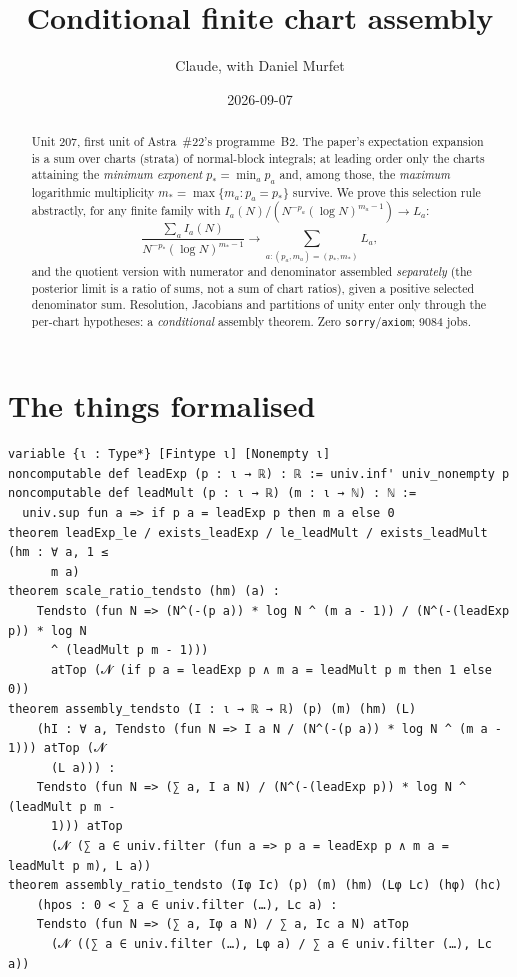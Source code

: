 \documentclass[11pt]{article}
\title{Conditional finite chart assembly}
\author{Claude, with Daniel Murfet}
\date{2026-09-07}
\begin{document}
\maketitle
\sloppy

\begin{abstract}
Unit 207, first unit of Astra~\#22's programme~B2. The paper's expectation expansion is a sum over
charts (strata) of normal-block integrals; at leading order only the charts attaining the
\emph{minimum exponent} $p_*=\min_ap_a$ and, among those, the \emph{maximum} logarithmic
multiplicity $m_*=\max\{m_a:p_a=p_*\}$ survive. We prove this selection rule abstractly, for any
finite family with $I_a(N)/(N^{-p_a}(\log N)^{m_a-1})\to L_a$:
\[
\frac{\sum_aI_a(N)}{N^{-p_*}(\log N)^{m_*-1}}\longrightarrow\sum_{a:(p_a,m_a)=(p_*,m_*)}L_a,
\]
and the quotient version with numerator and denominator assembled \emph{separately} (the posterior
limit is a ratio of sums, not a sum of chart ratios), given a positive selected denominator sum.
Resolution, Jacobians and partitions of unity enter only through the per-chart hypotheses: a
\emph{conditional} assembly theorem. Zero \texttt{sorry}/\texttt{axiom}; 9084 jobs.
\end{abstract}

\section{The things formalised}
{\small
\begin{verbatim}
variable {ι : Type*} [Fintype ι] [Nonempty ι]
noncomputable def leadExp (p : ι → ℝ) : ℝ := univ.inf' univ_nonempty p
noncomputable def leadMult (p : ι → ℝ) (m : ι → ℕ) : ℕ :=
  univ.sup fun a => if p a = leadExp p then m a else 0
theorem leadExp_le / exists_leadExp / le_leadMult / exists_leadMult (hm : ∀ a, 1 ≤
      m a)
theorem scale_ratio_tendsto (hm) (a) :
    Tendsto (fun N => (N^(-(p a)) * log N ^ (m a - 1)) / (N^(-(leadExp p)) * log N
      ^ (leadMult p m - 1)))
      atTop (𝓝 (if p a = leadExp p ∧ m a = leadMult p m then 1 else 0))
theorem assembly_tendsto (I : ι → ℝ → ℝ) (p) (m) (hm) (L)
    (hI : ∀ a, Tendsto (fun N => I a N / (N^(-(p a)) * log N ^ (m a - 1))) atTop (𝓝
      (L a))) :
    Tendsto (fun N => (∑ a, I a N) / (N^(-(leadExp p)) * log N ^ (leadMult p m -
      1))) atTop
      (𝓝 (∑ a ∈ univ.filter (fun a => p a = leadExp p ∧ m a = leadMult p m), L a))
theorem assembly_ratio_tendsto (Iφ Ic) (p) (m) (hm) (Lφ Lc) (hφ) (hc)
    (hpos : 0 < ∑ a ∈ univ.filter (…), Lc a) :
    Tendsto (fun N => (∑ a, Iφ a N) / ∑ a, Ic a N) atTop
      (𝓝 ((∑ a ∈ univ.filter (…), Lφ a) / ∑ a ∈ univ.filter (…), Lc a))
\end{verbatim}
}
\end{document}
